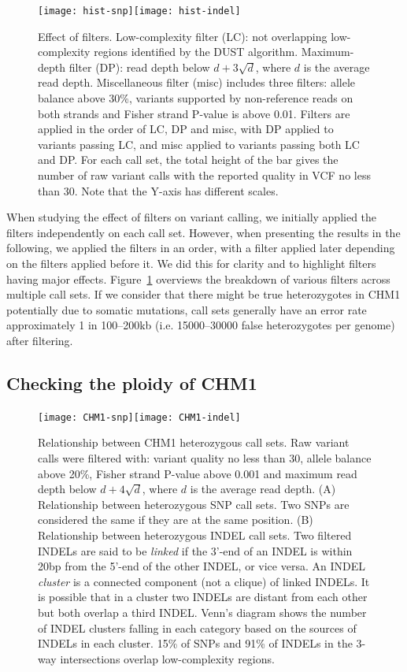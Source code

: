 \documentclass{bioinfo-ori}
\begin{document}
\begin{figure}[!ht]
\texttt{[image: hist-snp]}\texttt{[image: hist-indel]}
\caption{Effect of filters. Low-complexity filter (LC): not overlapping
low-complexity regions identified by the DUST algorithm. Maximum-depth filter
(DP): read depth below $d+3\sqrt{d}$, where $d$ is the average read depth.
Miscellaneous filter (misc) includes three filters: allele balance above 30\%,
variants supported by non-reference reads on both strands and Fisher strand
P-value is above 0.01. Filters are applied in the order of LC, DP and misc,
with DP applied to variants passing LC, and misc applied to variants passing
both LC and DP. For each call set, the total height of the bar gives the
number of raw variant calls with the reported quality in VCF no less than 30.
Note that the Y-axis has different scales.}\label{fig:hist}
\end{figure}

When studying the effect of filters on variant calling, we initially applied
the filters independently on each call set. However, when presenting the
results in the following, we applied the filters in an order, with a filter
applied later depending on the filters applied before it. We did this for
clarity and to highlight filters having major effects. Figure~\ref{fig:hist}
overviews the breakdown of various filters across multiple call sets.
If we consider that there might be true heterozygotes in CHM1 potentially due
to somatic mutations, call sets generally have an error rate approximately 1 in
100--200kb (i.e. 15000--30000 false heterozygotes per genome) after filtering.

\subsection{Checking the ploidy of CHM1}

\begin{figure}
\texttt{[image: CHM1-snp]}\texttt{[image: CHM1-indel]}
\caption{Relationship between CHM1 heterozygous call sets. Raw variant calls were filtered
with: variant quality no less than 30, allele balance above 20\%, Fisher strand
P-value above 0.001 and maximum read depth below $d+4\sqrt{d}$, where $d$ is
the average read depth. (A) Relationship between heterozygous SNP call sets. Two SNPs are
considered the same if they are at the same position. (B) Relationship between heterozygous
INDEL call sets. Two filtered INDELs are said to be \emph{linked} if the 3'-end
of an INDEL is within 20bp from the 5'-end of the other INDEL, or vice versa.
An INDEL \emph{cluster} is a connected component (not a clique) of linked
INDELs. It is possible that in a cluster two INDELs are distant from each other
but both overlap a third INDEL.  Venn's diagram shows the number of INDEL
clusters falling in each category based on the sources of INDELs in each
cluster. 15\% of SNPs and 91\% of INDELs in the 3-way intersections overlap
low-complexity regions.}\label{fig:venn-CHM1}
\end{figure}
\end{document}
